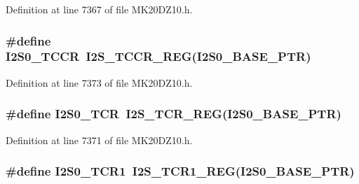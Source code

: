 Definition at line 7367 of file M\+K20\+D\+Z10.\+h.

\subsubsection[{\texorpdfstring{I2\+S0\+\_\+\+T\+C\+CR}{I2S0_TCCR}}]{\setlength{\rightskip}{0pt plus 5cm}\#define I2\+S0\+\_\+\+T\+C\+CR~{\bf I2\+S\+\_\+\+T\+C\+C\+R\+\_\+\+R\+EG}({\bf I2\+S0\+\_\+\+B\+A\+S\+E\+\_\+\+P\+TR})}\hypertarget{group___i2_s___register___accessor___macros_ga9643c0c80f0954a6c27d1d9618ed7cbd}{}\label{group___i2_s___register___accessor___macros_ga9643c0c80f0954a6c27d1d9618ed7cbd}


Definition at line 7373 of file M\+K20\+D\+Z10.\+h.

\subsubsection[{\texorpdfstring{I2\+S0\+\_\+\+T\+CR}{I2S0_TCR}}]{\setlength{\rightskip}{0pt plus 5cm}\#define I2\+S0\+\_\+\+T\+CR~{\bf I2\+S\+\_\+\+T\+C\+R\+\_\+\+R\+EG}({\bf I2\+S0\+\_\+\+B\+A\+S\+E\+\_\+\+P\+TR})}\hypertarget{group___i2_s___register___accessor___macros_ga733549b32eaf4abf94c7b17d8024814c}{}\label{group___i2_s___register___accessor___macros_ga733549b32eaf4abf94c7b17d8024814c}


Definition at line 7371 of file M\+K20\+D\+Z10.\+h.

\subsubsection[{\texorpdfstring{I2\+S0\+\_\+\+T\+C\+R1}{I2S0_TCR1}}]{\setlength{\rightskip}{0pt plus 5cm}\#define I2\+S0\+\_\+\+T\+C\+R1~{\bf I2\+S\+\_\+\+T\+C\+R1\+\_\+\+R\+EG}({\bf I2\+S0\+\_\+\+B\+A\+S\+E\+\_\+\+P\+TR})}\hypertarget{group___i2_s___register___accessor___macros_ga8648b4f2138e546297726060411e9f5f}{}\label{group___i2_s___register___accessor___macros_ga8648b4f2138e546297726060411e9f5f}


